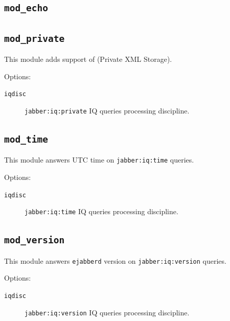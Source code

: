 \documentclass[10pt]{article}
\newcommand{\ns}[1]{\texttt{#1}}
\newcommand{\ejabberd}{\texttt{ejabberd}}
\newcommand{\modecho}{\texttt{mod\_echo}}
\newcommand{\modprivate}{\texttt{mod\_private}}
\newcommand{\modtime}{\texttt{mod\_time}}
\newcommand{\modversion}{\texttt{mod\_version}}
\begin{document}
\subsection{\modecho{}}
\label{sec:modecho}



\subsection{\modprivate{}}
\label{sec:modprivate}

This module adds support of
 (Private XML
Storage).

Options:
\begin{description}
\item[\texttt{iqdisc}] \ns{jabber:iq:private} IQ queries processing discipline.
\end{description}

\subsection{\modtime{}}
\label{sec:modtime}

This module answers UTC time on \ns{jabber:iq:time} queries.

Options:
\begin{description}
\item[\texttt{iqdisc}] \ns{jabber:iq:time} IQ queries processing discipline.
\end{description}


\subsection{\modversion{}}
\label{sec:modversion}

This module answers \ejabberd{} version on \ns{jabber:iq:version} queries.

Options:
\begin{description}
\item[\texttt{iqdisc}] \ns{jabber:iq:version} IQ queries processing discipline.
\end{description}
\end{document}
